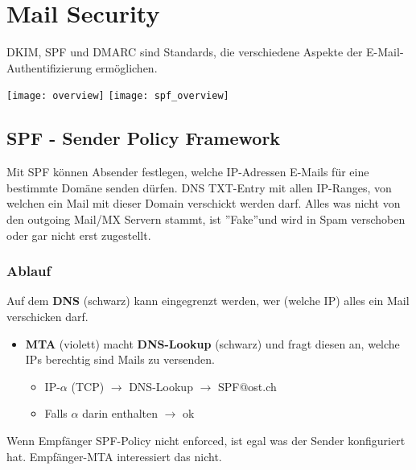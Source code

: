 

\section{Mail Security}
DKIM, SPF und DMARC sind Standards, die verschiedene Aspekte der E-Mail-Authentifizierung ermöglichen.

\begin{center}
    \texttt{[image: overview]}
    \texttt{[image: spf\_overview]}
\end{center}

\subsection{SPF - Sender Policy Framework}

Mit SPF können Absender festlegen, welche IP-Adressen E-Mails für eine bestimmte Domäne senden dürfen.
DNS TXT-Entry mit allen IP-Ranges, von welchen ein Mail mit dieser Domain verschickt werden darf.
Alles was nicht von den outgoing Mail/MX Servern stammt, ist ''Fake''und wird in Spam verschoben oder gar nicht erst zugestellt.

\subsubsection{Ablauf}
Auf dem \textbf{DNS} (schwarz) kann eingegrenzt werden, wer (welche IP) alles ein Mail verschicken darf.\\
\begin{itemize}
    \item \textcolor{OSTPink}{\textbf{MTA}} (violett) macht \textbf{DNS-Lookup} (schwarz) und fragt diesen an, welche IPs berechtig sind Mails zu versenden.
    \begin{itemize}
        \item IP-$\alpha$ (TCP) $\rightarrow$ DNS-Lookup $\rightarrow$ SPF@ost.ch
        \item Falls $\alpha$ darin enthalten $\rightarrow$ ok\\
    \end{itemize}
\end{itemize}

Wenn Empfänger SPF-Policy nicht enforced, ist egal was der Sender konfiguriert hat. Empfänger-MTA interessiert das nicht.


